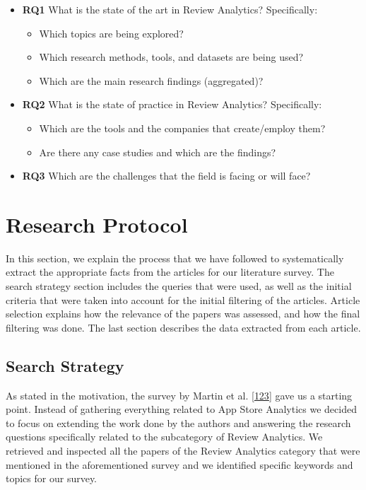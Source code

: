 \documentclass[]{book}
\providecommand{\tightlist}{%
  \setlength{\itemsep}{0pt}\setlength{\parskip}{0pt}}
\begin{document}
\begin{itemize}
\tightlist
\item
  \textbf{RQ1} What is the state of the art in Review Analytics?
  Specifically:

  \begin{itemize}
  \tightlist
  \item
    Which topics are being explored?
  \item
    Which research methods, tools, and datasets are being used?
  \item
    Which are the main research findings (aggregated)?
  \end{itemize}
\item
  \textbf{RQ2} What is the state of practice in Review Analytics?
  Specifically:

  \begin{itemize}
  \tightlist
  \item
    Which are the tools and the companies that create/employ them?
  \item
    Are there any case studies and which are the findings?
  \end{itemize}
\item
  \textbf{RQ3} Which are the challenges that the field is facing or will
  face?
\end{itemize}

\section{Research Protocol}\label{research-protocol-5}

In this section, we explain the process that we have followed to
systematically extract the appropriate facts from the articles for our
literature survey. The search strategy section includes the queries that
were used, as well as the initial criteria that were taken into account
for the initial filtering of the articles. Article selection explains
how the relevance of the papers was assessed, and how the final
filtering was done. The last section describes the data extracted from
each article.

\subsection{Search Strategy}\label{search-strategy-1}

As stated in the motivation, the survey by Martin et al.
{[}\protect\hyperlink{ref-martin2015survey}{123}{]} gave us a starting
point. Instead of gathering everything related to App Store Analytics we
decided to focus on extending the work done by the authors and answering
the research questions specifically related to the subcategory of Review
Analytics. We retrieved and inspected all the papers of the Review
Analytics category that were mentioned in the aforementioned survey and
we identified specific keywords and topics for our survey.
\end{document}
